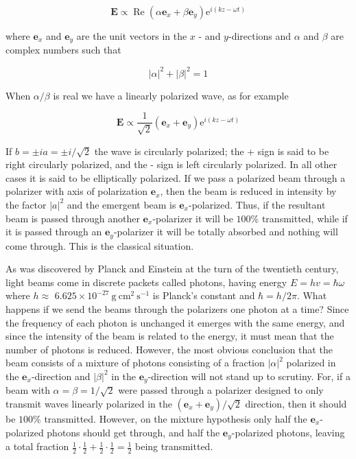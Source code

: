 \documentclass[10pt]{article}
\begin{document}
$$
\mathbf{E} \propto \operatorname{Re}\left(\alpha \mathbf{e}_{x}+\beta \mathbf{e}_{y}\right) \mathrm{e}^{i(k z-\omega t)}
$$

where $\mathbf{e}_{x}$ and $\mathbf{e}_{y}$ are the unit vectors in the $x$ - and $y$-directions and $\alpha$ and $\beta$ are complex numbers such that

$$
|\alpha|^{2}+|\beta|^{2}=1
$$

When $\alpha / \beta$ is real we have a linearly polarized wave, as for example

$$
\mathbf{E} \propto \frac{1}{\sqrt{2}}\left(\mathbf{e}_{x}+\mathbf{e}_{y}\right) \mathrm{e}^{i(k z-\omega t)}
$$

If $b= \pm i a= \pm i / \sqrt{2}$ the wave is circularly polarized; the + sign is said to be right circularly polarized, and the - sign is left circularly polarized. In all other cases it is said to be elliptically polarized. If we pass a polarized beam through a polarizer with axis of polarization $\mathbf{e}_{x}$, then the beam is reduced in intensity by the factor $|a|^{2}$ and the emergent beam is $\mathbf{e}_{x}$-polarized. Thus, if the resultant beam is passed through another $\mathbf{e}_{x}$-polarizer it will be $100 \%$ transmitted, while if it is passed through an $\mathbf{e}_{y}$-polarizer it will be totally absorbed and nothing will come through. This is the classical situation.

As was discovered by Planck and Einstein at the turn of the twentieth century, light beams come in discrete packets called photons, having energy $E=h v=\hbar \omega$ where $h \approx$ $6.625 \times 10^{-27} \mathrm{~g} \mathrm{~cm}^{2} \mathrm{~s}^{-1}$ is Planck's constant and $\hbar=h / 2 \pi$. What happens if we send the beams through the polarizers one photon at a time? Since the frequency of each photon is unchanged it emerges with the same energy, and since the intensity of the beam is related to the energy, it must mean that the number of photons is reduced. However, the most obvious conclusion that the beam consists of a mixture of photons consisting of a fraction $|\alpha|^{2}$ polarized in the $\mathbf{e}_{x}$-direction and $|\beta|^{2}$ in the $\mathbf{e}_{y}$-direction will not stand up to scrutiny. For, if a beam with $\alpha=\beta=1 / \sqrt{2}$ were passed through a polarizer designed to only transmit waves linearly polarized in the $\left(\mathbf{e}_{x}+\mathbf{e}_{y}\right) / \sqrt{2}$ direction, then it should be $100 \%$ transmitted. However, on the mixture hypothesis only half the $\mathbf{e}_{x}$-polarized photons should get through, and half the $\mathbf{e}_{y}$-polarized photons, leaving a total fraction $\frac{1}{2} \cdot \frac{1}{2}+\frac{1}{2} \cdot \frac{1}{2}=\frac{1}{2}$ being transmitted.
\end{document}
